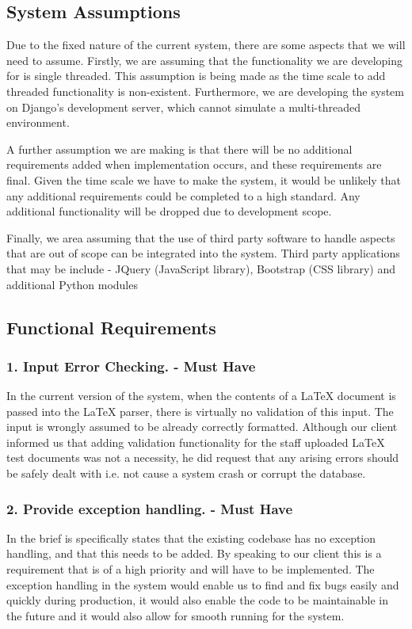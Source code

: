 	\subsection*{System Assumptions}
	Due to the fixed nature of the current system, there are some aspects that we will need to assume. Firstly, we are assuming that the functionality we are developing for is single threaded. This assumption is being made as the time scale to add threaded functionality is non-existent. Furthermore, we are developing the system on Django's development server, which cannot simulate a multi-threaded environment. 
	
	A further assumption we are making is that there will be no additional requirements added when implementation occurs, and these requirements are final. Given the time scale we have to make the system, it would be unlikely that any additional requirements could be completed to a high standard. Any additional functionality will be dropped due to development scope. 
	
	Finally, we area assuming that the use of third party software to handle aspects that are out of scope can be integrated into the system. Third party applications that may be include - JQuery (JavaScript library), Bootstrap (CSS library) and additional Python modules
	\subsection*{Functional Requirements}
	\subsubsection*{1. Input Error Checking. - Must Have}
	In the current version of the system, when the contents of a LaTeX document is passed into the LaTeX parser, there is virtually no validation of this input. The input is wrongly assumed to be already correctly formatted. Although our client informed us that adding validation functionality for the staff uploaded LaTeX test documents was not a necessity, he did request that any arising errors should be safely dealt with i.e. not cause a system crash or corrupt the database.
	\subsubsection*{2. Provide exception handling. - Must Have}
	In the brief is specifically states that the existing codebase has no exception handling, and that this needs to be added. By speaking to our client this is a requirement that is of a high priority and will have to be implemented.
The exception handling in the system would enable us to find and fix bugs easily and quickly during production, it would also enable the code to be maintainable in the future and it would also allow for smooth running for the system.

